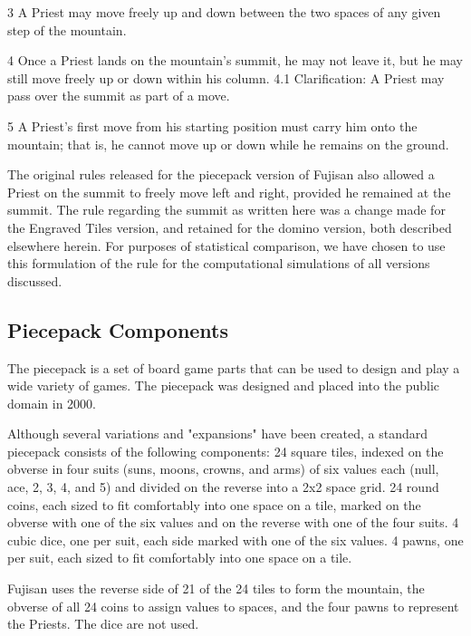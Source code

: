 \documentclass[10pt,journal,compsoc]{IEEEtran}
\begin{document}
3   A Priest may move freely up and down between the two spaces of any given step of the mountain. %

4   Once a Priest lands on the mountain's summit, he may not leave it, but he may still move freely up or down within his column.
4.1 Clarification: A Priest may pass over the summit as part of a move.

5   A Priest's first move from his starting position must carry him onto the mountain; that is, he cannot move up or down while he remains on the ground.
    
The original rules released for the piecepack version of Fujisan also allowed a Priest on the summit to freely move left and right, provided he remained at the summit. The rule regarding the summit as written here was a change made for the Engraved Tiles version, and retained for the domino version, both described elsewhere herein. For purposes of statistical comparison, we have chosen to use this formulation of the rule for the computational simulations of all versions discussed.

\subsection{Piecepack Components}

The piecepack is a set of board game parts that can be used to design and play a wide variety of games. The piecepack was designed and placed into the public domain in 2000.

Although several variations and "expansions" have been created, a standard piecepack consists of the following components:
24 square tiles, indexed on the obverse in four suits (suns, moons, crowns, and arms) of six values each (null, ace, 2, 3, 4, and 5) and divided on the reverse into a 2x2 space grid.
24 round coins, each sized to fit comfortably into one space on a tile, marked on the obverse with one of the six values and on the reverse with one of the four suits.
4 cubic dice, one per suit, each side marked with one of the six values.
4 pawns, one per suit, each sized to fit comfortably into one space on a tile.

Fujisan uses the reverse side of 21 of the 24 tiles to form the mountain, the obverse of all 24 coins to assign values to spaces, and the four pawns to represent the Priests. The dice are not used.
\end{document}
